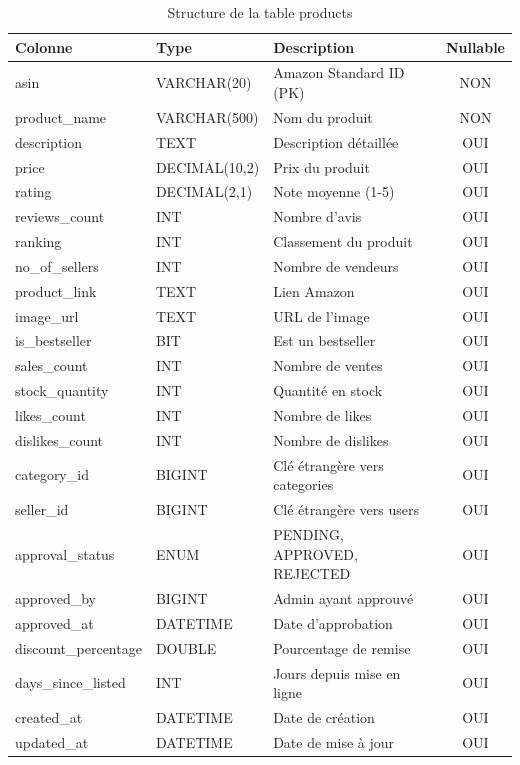 \documentclass[12pt,a4paper]{report}
\begin{document}
\begin{table}[H]
    \centering
    \caption{Structure de la table products}
    \small
    \begin{tabularx}{\textwidth}{llXc}
        \toprule
        \textbf{Colonne} & \textbf{Type} & \textbf{Description} & \textbf{Nullable} \\
        \midrule
        asin & VARCHAR(20) & Amazon Standard ID (PK) & NON \\
        product\_name & VARCHAR(500) & Nom du produit & NON \\
        description & TEXT & Description détaillée & OUI \\
        price & DECIMAL(10,2) & Prix du produit & OUI \\
        rating & DECIMAL(2,1) & Note moyenne (1-5) & OUI \\
        reviews\_count & INT & Nombre d'avis & OUI \\
        ranking & INT & Classement du produit & OUI \\
        no\_of\_sellers & INT & Nombre de vendeurs & OUI \\
        product\_link & TEXT & Lien Amazon & OUI \\
        image\_url & TEXT & URL de l'image & OUI \\
        is\_bestseller & BIT & Est un bestseller & OUI \\
        sales\_count & INT & Nombre de ventes & OUI \\
        stock\_quantity & INT & Quantité en stock & OUI \\
        likes\_count & INT & Nombre de likes & OUI \\
        dislikes\_count & INT & Nombre de dislikes & OUI \\
        category\_id & BIGINT & Clé étrangère vers categories & OUI \\
        seller\_id & BIGINT & Clé étrangère vers users & OUI \\
        approval\_status & ENUM & PENDING, APPROVED, REJECTED & OUI \\
        approved\_by & BIGINT & Admin ayant approuvé & OUI \\
        approved\_at & DATETIME & Date d'approbation & OUI \\
        discount\_percentage & DOUBLE & Pourcentage de remise & OUI \\
        days\_since\_listed & INT & Jours depuis mise en ligne & OUI \\
        created\_at & DATETIME & Date de création & OUI \\
        updated\_at & DATETIME & Date de mise à jour & OUI \\
        \bottomrule
    \end{tabularx}
    \label{tab:products}
\end{table}
\end{document}
